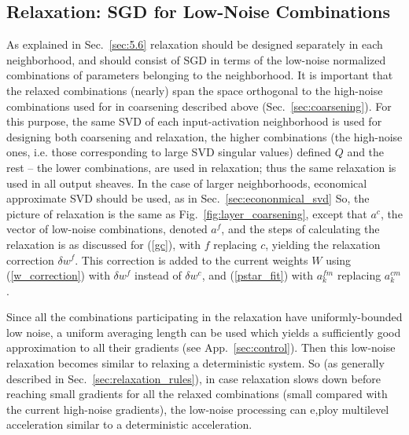 \documentclass{article} %
\begin{document}
\subsection{Relaxation: SGD for Low-Noise Combinations}
\label{sec:sgd_relaxation}
As explained in Sec.~\ref{sec:5.6} relaxation should be designed separately in each neighborhood, and should consist of SGD in terms of the low-noise normalized combinations of parameters belonging to the neighborhood. It is important that the relaxed combinations (nearly) span the space orthogonal to the high-noise combinations used for in coarsening described above (Sec.~\ref{sec:coarsening}). For this purpose, the same SVD of each input-activation neighborhood is used for designing both coarsening and relaxation, the higher combinations (the high-noise ones, i.e. those corresponding to large SVD singular values) defined $Q$ and the rest -- the lower combinations, are used in relaxation; thus the same relaxation is used in all output sheaves. In the case of larger neighborhoods, economical approximate SVD should be used, as in Sec.~\ref{sec:econonmical_svd} So, the picture of relaxation is the same as Fig.~\ref{fig:layer_coarsening}, except that $a^c$, the vector of low-noise combinations, denoted $a^f$, and the steps of calculating the relaxation is as discussed for (\ref{gc}), with $f$ replacing $c$, yielding the relaxation correction $\delta w^f$. This correction is added to the current weights $W$ using (\ref{w_correction}) with $\delta w^f$ instead of $\delta w^c$, and (\ref{pstar_fit}) with $a^{fm}_k$ replacing $a^{cm}_k$.

Since all the combinations participating in the relaxation have uniformly-bounded low noise, a uniform averaging length can be used which yields a sufficiently good approximation to all their gradients (see App.~\ref{sec:control}). Then this low-noise relaxation becomes similar to relaxing a deterministic system. So (as generally described in Sec.~\ref{sec:relaxation_rules}), in case relaxation slows down before reaching small gradients for all the relaxed combinations (small compared with the current high-noise gradients), the low-noise processing can e,ploy multilevel acceleration similar to a deterministic acceleration.
\end{document}

